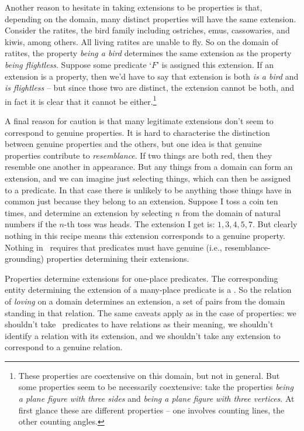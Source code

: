 Another reason to hesitate in taking extensions to be properties is that, depending on the domain, many distinct properties will have the same extension. Consider the ratites, the bird family including ostriches, emus, cassowaries, and kiwis, among others. All living ratites are unable to fly. So on the domain of ratites, the property \emph{being a bird} determines the same extension as the property \emph{being flightless}. Suppose some predicate `$F$' is assigned this extension. If an extension is a property, then we'd have to say that extension is both \emph{is a bird} and \emph{is flightless} – but since those two are distinct, the extension cannot be both, and in fact it is clear that it cannot be either.\footnote{These properties are coextensive on this domain, but not in general. But some properties seem to be necessarily coextensive: take the properties \emph{being a plane figure with three sides} and \emph{being a plane figure with three vertices}. At first glance these are different properties – one involves counting lines, the other counting angles.}

A final reason for caution is that many legitimate extensions don't seem to correspond to genuine properties. It is hard to characterise the distinction between genuine properties and the others, but one idea is that genuine properties contribute to \emph{resemblance}. If two things are both red, then they resemble one another in appearance. But any things from a domain can form an extension, and we can imagine just selecting things, which can then be assigned to a predicate. In that case there is unlikely to be anything those things have in common just because they belong to an extension. Suppose I toss a coin ten times, and determine an extension by selecting $n$ from the domain of natural numbers if the $n$-th toss was heads. The extension I get is: $1, 3, 4, 5, 7$. But clearly nothing in this recipe means this extension corresponds to a genuine property. Nothing in \FOL\ requires that predicates must have genuine (i.e., resemblance-grounding) properties determining their extensions.  

Properties determine extensions for one-place predicates. The corresponding entity determining the extension of a many-place predicate is a . So the relation of \emph{loving} on a domain determines an extension, a set of pairs from the domain standing in that relation. The same caveats apply as in the case of properties: we shouldn't take \FOL\ predicates to have relations as their meaning, we shouldn't identify a relation with its extension, and we shouldn't take any extension to correspond to a genuine relation.

